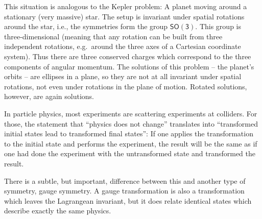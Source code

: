 \documentclass[12pt]{report}
\newcommand{\2}{\ensuremath{\sqrt{2}\,}}
\begin{document}
{      This situation is analogous to the Kepler problem: A planet moving
      around a stationary 
      (very massive) star. The setup is invariant under spatial rotations around the star, i.e., the
      symmetries form the group $\mathsf{SO(3)}$. This group is three-dimensional 
      (meaning that any rotation can be built from three independent rotations, e.g.\ around the
      three axes of a Cartesian coordinate system). Thus there are three conserved charges
      which correspond to the three components of angular momentum. The
      solutions of this problem -- the planet's orbits -- are ellipses in a plane, so they are not
      at all invariant under spatial rotations, not even under rotations in the plane of
      motion. Rotated solutions, however, are again solutions.
      
      In particle physics, most experiments are scattering experiments at colliders. For those, the
      statement that ``physics does not change'' translates into ``transformed initial states lead
      to transformed final states'': If one applies the transformation to the initial state and
      performs the experiment, the result will be the same as if one had done the experiment with
      the untransformed state and transformed the result.
    
      \medskip
      
      There is a subtle, but important, difference between this and another type of symmetry,
      gauge symmetry.  A gauge transformation is also a transformation which leaves the Lagrangean
      invariant, but it does relate identical states which describe exactly the same
      physics.
      
}
\end{document}
